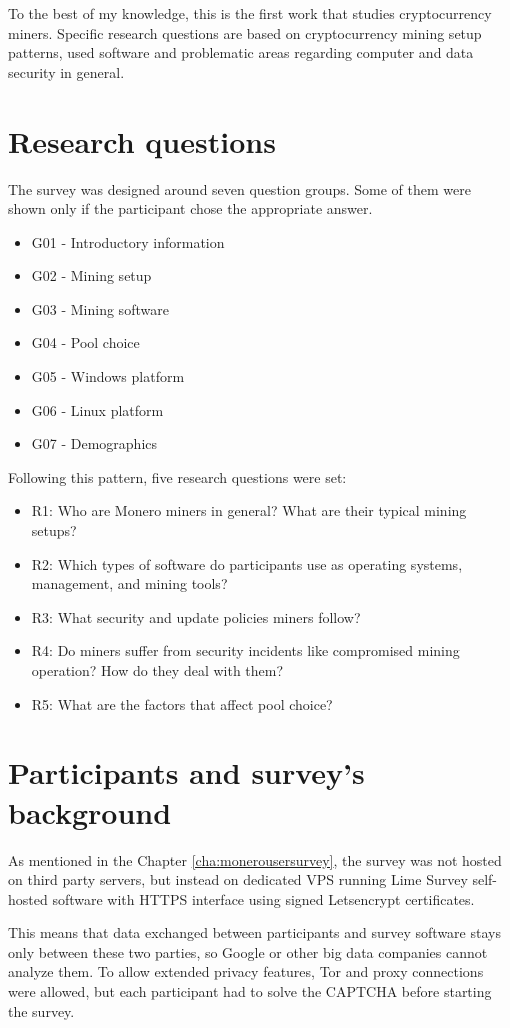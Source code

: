 \documentclass[
  printed, %
  table,   %
  lof,     %
  lot,     %
           oneside, color
]{fithesis3}
\begin{document}
To the best of my knowledge, this is the first work that studies cryptocurrency miners. Specific research questions are based on cryptocurrency mining setup patterns, used software and problematic areas regarding computer and data security in general. 

\section{Research questions}
The survey was designed around seven question groups. Some of them were shown only if the participant chose the appropriate answer.
\begin{itemize}\itemsep0em
\item G01 - Introductory information
\item G02 - Mining setup
\item G03 - Mining software
\item G04 - Pool choice
\item G05 - Windows platform
\item G06 - Linux platform
\item G07 - Demographics
\end{itemize}
Following this pattern, five research questions were set:
\begin{itemize}\itemsep0em
\item R1: Who are Monero miners in general? What are their typical mining setups? 
\item R2: Which types of software do participants use as operating systems, management, and mining tools?
\item R3: What security and update policies miners follow? 
\item R4: Do miners suffer from security incidents like compromised mining operation? How do they deal with them?
\item R5: What are the factors that affect pool choice?
\end{itemize}
\section{Participants and survey's background}
As mentioned in the Chapter \ref{cha:monerousersurvey}, the survey was not hosted on third party servers, but instead on dedicated VPS running Lime Survey self-hosted software with HTTPS interface using signed Letsencrypt certificates.

This means that data exchanged between participants and survey software stays only between these two parties, so Google or other big data companies cannot analyze them. To allow extended privacy features, Tor and proxy connections were allowed, but each participant had to solve the CAPTCHA before starting the survey.
\end{document}
